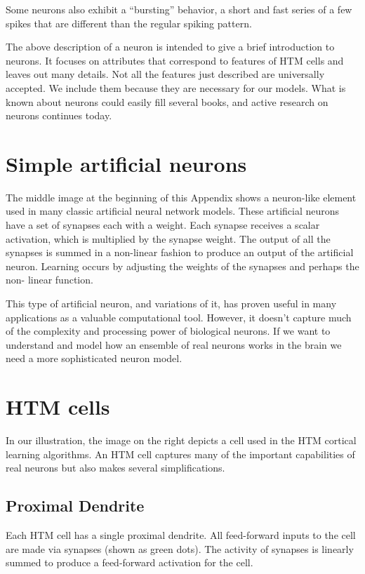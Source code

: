 \documentclass{report}
\begin{document}
Some neurons also exhibit a ``bursting'' behavior, a short and fast
series of a few spikes that are different than the regular spiking
pattern.

The above description of a neuron is intended to give a brief
introduction to neurons. It focuses on attributes that correspond to
features of HTM cells and leaves out many details. Not all the
features just described are universally accepted. We include them
because they are necessary for our models. What is known about neurons
could easily fill several books, and active research on neurons
continues today.

\section*{Simple artificial neurons}
The middle image at the beginning of this Appendix shows a neuron-like
element used in many classic artificial neural network models. These
artificial neurons have a set of synapses each with a weight. Each
synapse receives a scalar activation, which is multiplied by the
synapse weight. The output of all the synapses is summed in a
non-linear fashion to produce an output of the artificial
neuron. Learning occurs by adjusting the weights of the synapses and
perhaps the non- linear function.

This type of artificial neuron, and variations of it, has proven
useful in many applications as a valuable computational tool. However,
it doesn't capture much of the complexity and processing power of
biological neurons. If we want to understand and model how an ensemble
of real neurons works in the brain we need a more sophisticated neuron
model.

\section*{HTM cells}
In our illustration, the image on the right depicts a cell used in the
HTM cortical learning algorithms. An HTM cell captures many of the
important capabilities of real neurons but also makes several
simplifications.

\subsection*{Proximal Dendrite}
Each HTM cell has a single proximal dendrite. All feed-forward inputs
to the cell are made via synapses (shown as green dots). The activity
of synapses is linearly summed to produce a feed-forward activation
for the cell.
\end{document}
